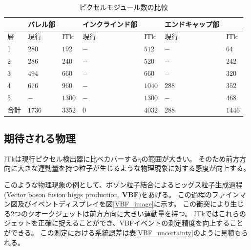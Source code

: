\begin{table}[tbp]
\begin{center}
\caption[ピクセルモジュール数の比較]{ピクセルモジュール数の比較}
\label{compare_itk_modules}
  \begin{tabular}{|l||ll|ll|ll|} \hline
          & バレル部 &            & インクラインド部 & & エンドキャップ部 & \\ \hline 
    層    & 現行     & ITk        & 現行& ITk          & 現行  & ITk \\ \hline
    1     & $280$    & $192$      & $-$ & $512$        & $-$   & $64$ \\ 
    2     & $286$    & $240$      & $-$ & $520$        & $-$   & $242$ \\ 
    3     & $494$    & $660$      & $-$ & $660$        & $-$   & $320$ \\ 
    4     & $676$    & $960$      & $-$ & $1040$       & $288$ & $352$ \\ 
    5     & $-$      & $1300$     & $-$ & $1300$       & $-$   & $468$ \\ \hline
    合計  & $1736$   & $3352$     & $0$ & $4032$       & $288$ & $1446$ \\ \hline\hline
  \end{tabular}
\end{center}
\end{table}

\subsection{期待される物理}
ITkは現行ピクセル検出器に比べカバーする$\eta$の範囲が大きい。
そのため前方方向に大きな運動量を持つ粒子が生じるような物理現象に対する感度が向上する。

このような物理現象の例として、ボゾン粒子結合によるヒッグス粒子生成過程(Vector boson fusion higgs production, \textbf{VBF})をあげる。
この過程のファインマン図及びイベントディスプレイを図\ref{VBF_image}に示す。
この衝突により生じる2つのクオークジェットは前方方向に大きい運動量を持つ。
ITkではこれらのジェットを正確に捉えることができ、VBFイベントの測定精度を向上することができる。
この測定における系統誤差は表\ref{VBF_uncertainty}のように見積もられる\cite{1-3}。

